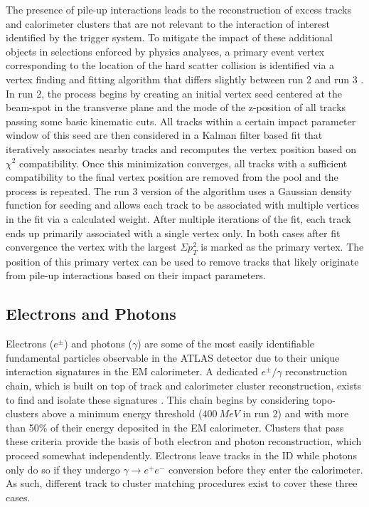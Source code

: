 The presence of pile-up interactions leads to the reconstruction of excess tracks and calorimeter clusters that are not 
relevant to the interaction of interest identified by the trigger system. To mitigate the impact of these additional 
objects in selections enforced by physics analyses, a primary event vertex corresponding to the location of the hard 
scatter collision is identified via a vertex finding and fitting algorithm that differs slightly between run 2 and run 3 
\cite{atlas-vertex-reco-run2, atlas-vertex-reco-run3}. In run 2, the process begins by creating an initial vertex seed 
centered at the beam-spot in the transverse plane and the mode of the z-position of all tracks passing some basic 
kinematic cuts. All tracks within a certain impact parameter window of this seed are then considered in a Kalman filter 
based fit that iteratively associates nearby tracks and recomputes the vertex position based on $\chi^2$ compatibility. 
Once this minimization converges, all tracks with a sufficient compatibility to the final vertex position are removed 
from the pool and the process is repeated. The run 3 version of the algorithm uses a Gaussian density function for 
seeding and allows each track to be associated with multiple vertices in the fit via a calculated weight. After multiple 
iterations of the fit, each track ends up primarily associated with a single vertex only. In both cases after fit 
convergence the vertex with the largest $\Sigma p_T^2$ is marked as the primary vertex. The position of this primary 
vertex can be used to remove tracks that likely originate from pile-up interactions based on their impact parameters. 
\par

\subsection{Electrons and Photons}

Electrons ($e^{\pm}$) and photons ($\gamma$) are some of the most easily identifiable fundamental particles 
observable in the ATLAS detector due to their unique interaction signatures in the EM calorimeter. A dedicated 
$e^{\pm}/\gamma$ reconstruction chain, which is built on top of track and calorimeter cluster reconstruction, exists to 
find and isolate these signatures \cite{atlas-electrons-photons-reco}. This chain begins by considering topo-clusters 
above a minimum energy threshold ($400\ MeV$ in run 2) and with more than 50\% of their energy deposited in the EM 
calorimeter. Clusters that pass these criteria provide the basis of both electron and photon reconstruction, which 
proceed somewhat independently. Electrons leave tracks in the ID while photons only do so if they undergo 
$\gamma \rightarrow e^+e^-$ conversion before they enter the calorimeter. As such, different track to cluster matching 
procedures exist to cover these three cases. \par

